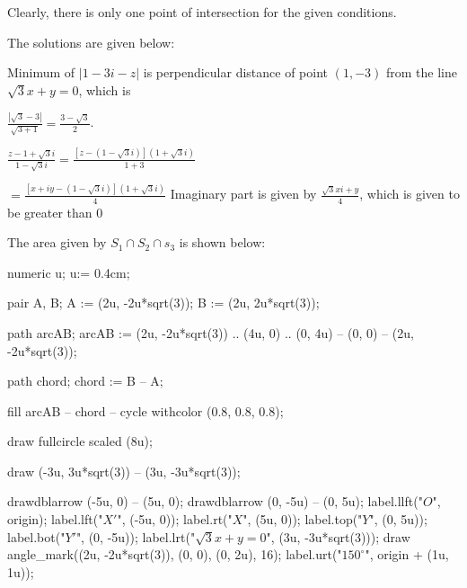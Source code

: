     Clearly, there is only one point of intersection for the given conditions.
  \stopitemize
\item The solutions are given below:
  \startitemize[i]
  \item Minimum of $|1 - 3i - z|$ is perpendicular distance of point $(1, -3)$ from the line $\sqrt{3}x + y
    = 0$, which is

    $\frac{|\sqrt{3} - 3|}{\sqrt{3 + 1}} = \frac{3 - \sqrt{3}}{2}$.
  \item $\frac{z - 1 + \sqrt{3}i}{1 - \sqrt{3}i} = \frac{[z - (1 - \sqrt{3}i)](1 + \sqrt{3}i)}{1 + 3}$

    $= \frac{[x + iy - (1 - \sqrt{3}i)](1 + \sqrt{3}i)}{4}$ Imaginary part is given by $\frac{\sqrt{3}xi +
    y}{4}$, which is given to be greater than $0$

    The area given by $S_1\cap S_2\cap s_3$ is shown below:

    \startplacefigure[location=force]
      \startMPcode
        numeric u;
        u:= 0.4cm;

        pair A, B;
        A := (2u, -2u*sqrt(3));
        B := (2u, 2u*sqrt(3));

        path arcAB;
        arcAB := (2u, -2u*sqrt(3))
        .. (4u, 0)
        .. (0, 4u)
        -- (0, 0)
        -- (2u, -2u*sqrt(3));

        path chord;
        chord := B -- A;

        fill arcAB -- chord -- cycle withcolor (0.8, 0.8, 0.8);

        draw fullcircle scaled (8u);

        draw (-3u, 3u*sqrt(3)) -- (3u, -3u*sqrt(3)); %

        drawdblarrow (-5u, 0) -- (5u, 0);
        drawdblarrow (0, -5u) -- (0, 5u);
        label.llft("$O$", origin);
        label.lft("$X'$", (-5u, 0));
        label.rt("$X$", (5u, 0));
        label.top("$Y$", (0, 5u));
        label.bot("$Y'$", (0, -5u));
        label.lrt("$\sqrt{3}x + y = 0$", (3u, -3u*sqrt(3)));
        draw angle_mark((2u, -2u*sqrt(3)), (0, 0), (0, 2u), 16);
        label.urt("$150^\circ$", origin + (1u,  1u));
      \stopMPcode
    \stopplacefigure

